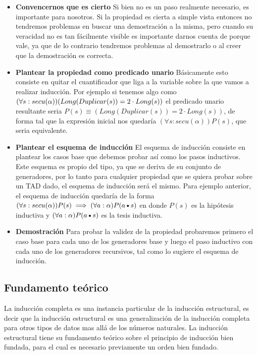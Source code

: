 \begin{itemize}
 \item \textbf{Convencernos que es cierto} Si bien no es un paso realmente necesario, es importante para nosotros. Si la propiedad es cierta a simple vista entonces no tendremos problemas en buscar una demostraci\'on a la misma, pero cuando su veracidad no es tan f\'acilmente visible es importante darnos cuenta de porque vale, ya que de lo contrario tendremos problemas al demostrarlo o al creer que la demostraci\'on es correcta.
 \item \textbf{Plantear la propiedad como predicado unario} B\'asicamente esto consiste en quitar el cuantificador que liga a la variable sobre la que vamos a realizar inducci\'on. Por ejemplo si tenemos algo como $(\forall s: secu(\alpha))\\ (Long(Duplicar(s)) = 2 \cdot Long(s))$ el predicado unario resultante seria $P(s) \equiv (Long(Duplicar(s)) = 2 \cdot Long(s))$, de forma tal que la expresi\'on inicial nos quedar\'ia $(\forall s: secu(\alpha)) P(s)$, que seria equivalente.
 \item \textbf{Plantear el esquema de inducci\'on} El esquema de inducci\'on consiste en plantear los casos base que debemos probar as\'i como los pasos inductivos. Este esquema es propio del tipo, ya que se deriva de su conjunto de generadores, por lo tanto para cualquier propiedad que se quiera probar sobre un TAD dado, el esquema de inducci\'on ser\'a el mismo. Para ejemplo anterior, el esquema de inducci\'on quedar\'ia de la forma $(\forall s: secu(\alpha)) P(s) \implies (\forall a: \alpha) P(a \text{\textbullet} s)$ en donde $P(s)$ es la hip\'otesis inductiva y $(\forall a: \alpha) P(a \text{\textbullet} s)$ es la tesis inductiva.
 \item \textbf{Demostraci\'on} Para probar la validez de la propiedad probaremos primero el caso base para cada uno de los generadores base y luego el paso inductivo con cada uno de los generadores recursivos, tal como lo sugiere el esquema de inducci\'on.
\end{itemize}


\subsection{Fundamento te\'orico}

La inducci\'on completa es una instancia particular de la inducci\'on estructural, es decir que la inducci\'on estructural es una generalizaci\'on de la inducci\'on completa para otros tipos de datos mas all\'a de los n\'umeros naturales. La inducci\'on estructural tiene su fundamento te\'orico sobre el principio de inducci\'on bien fundada, para el cual es necesario previamente un orden bien fundado.

